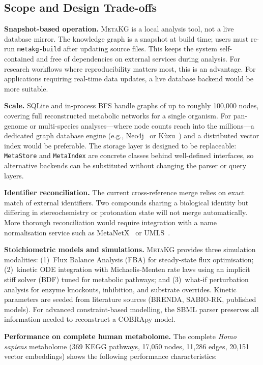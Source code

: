 \documentclass[10pt]{article}
\begin{document}
\subsection{Scope and Design Trade-offs}

\textbf{Snapshot-based operation.} \textsc{MetaKG} is a local analysis tool,
not a live database mirror. The knowledge graph is a snapshot at build time;
users must re-run \texttt{metakg-build} after updating source files. This
keeps the system self-contained and free of dependencies on external services
during analysis. For research workflows where reproducibility matters most,
this is an advantage. For applications requiring real-time data updates, a
live database backend would be more suitable.

\textbf{Scale.} SQLite and in-process BFS handle graphs of up to roughly
100,000 nodes, covering full reconstructed metabolic networks for a single
organism. For pan-genome or multi-species analyses---where node counts reach
into the millions---a dedicated graph database engine (e.g.,
Neo4j~\citep{neo4j2020} or K\`uzu~\citep{feng2023kuzu}) and a distributed
vector index would be preferable. The storage layer is designed to be
replaceable: \texttt{MetaStore} and \texttt{MetaIndex} are concrete classes
behind well-defined interfaces, so alternative backends can be substituted
without changing the parser or query layers.

\textbf{Identifier reconciliation.} The current cross-reference merge relies
on exact match of external identifiers. Two compounds sharing a biological
identity but differing in stereochemistry or protonation state will not merge
automatically. More thorough reconciliation would require integration with a
name normalisation service such as
MetaNetX~\citep{moretti2021metanetx} or UMLS~\citep{bodenreider2004umls}.

\textbf{Stoichiometric models and simulations.} \textsc{MetaKG} provides
three simulation modalities: (1)~Flux Balance Analysis (FBA) for steady-state
flux optimisation; (2)~kinetic ODE integration with Michaelis-Menten rate laws
using an implicit stiff solver (BDF) tuned for metabolic pathways; and
(3)~what-if perturbation analysis for enzyme knockouts, inhibition, and
substrate overrides. Kinetic parameters are seeded from literature sources
(BRENDA, SABIO-RK, published models). For advanced constraint-based modelling,
the SBML parser preserves all information needed to reconstruct a COBRApy
model.

\textbf{Performance on complete human metabolome.} The complete
\textit{Homo sapiens} metabolome (369 KEGG pathways, 17,050 nodes, 11,286
edges, 20,151 vector embeddings) shows the following performance
characteristics:
\end{document}
